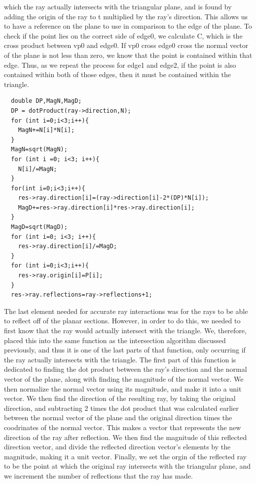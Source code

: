 \documentclass{article}
\begin{document}
which the ray actually intersects with the triangular plane, and is found by adding the origin of the ray to t multiplied by the ray's
direction. This allows us to have a reference on the plane to use in comparison to the edge of the plane.  To check if the point lies
on the correct side of edge0, we calculate C, which is the cross product between vp0 and edge0. If vp0 cross edge0 cross the normal
vector of the plane is not less than zero, we know that the point is contained within that edge. Thus, as we repeat the process for
edge1 and edge2, if the point is also contained within both of those edges, then it must be contained within the triangle.
\begin{lstlisting}
  double DP,MagN,MagD;
  DP = dotProduct(ray->direction,N);
  for (int i=0;i<3;i++){
    MagN+=N[i]*N[i];
  }
  MagN=sqrt(MagN);
  for (int i =0; i<3; i++){
    N[i]/=MagN;
  }
  for(int i=0;i<3;i++){
    res->ray.direction[i]=(ray->direction[i]-2*(DP)*N[i]);
    MagD+=res->ray.direction[i]*res->ray.direction[i];
  }
  MagD=sqrt(MagD);
  for (int i=0; i<3; i++){
    res->ray.direction[i]/=MagD;
  }
  for (int i=0;i<3;i++){
    res->ray.origin[i]=P[i];
  }
  res->ray.reflections=ray->reflections+1;
\end{lstlisting}
The last element needed for accurate ray interactions was for the rays to be able to reflect off of the planar sections. However, in order
to do this, we needed to first know that the ray would actually intersect with the triangle. We, therefore, placed this into the same function
as the intersection algorithm discussed previously, and thus it is one of the last parts of that function, only occurring if the ray actually
intersects with the triangle. The first part of this function is dedicated to finding the dot product between the ray's direction and the
normal vector of the plane, along with finding the magnitude of the normal vector. We then normalize the normal vector using its magnitude,
and make it into a unit vector. We then find the direction of the resulting ray, by taking the original direction, and subtracting 2 times the
dot product that was calculated earlier between the normal vector of the plane and the original direction times the coodrinates of the normal vector.
This makes a vector that represents the new direction of the ray after reflection. We then find the magnitude of this reflected direction vector,
and divide the reflected direction vector's elements by the magnitude, making it a unit vector. Finally, we set the orgin of the reflected ray to be
the point at which the original ray intersects with the triangular plane, and we increment the number of reflections that the ray has made.
\end{document}
